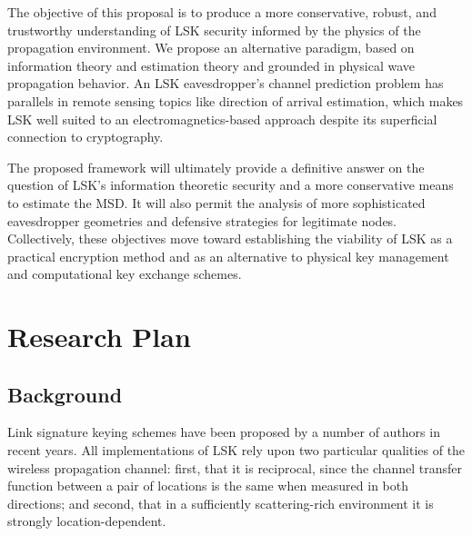 \documentclass[12pt, titlepage]{article}
\begin{document}
The objective of this proposal is to produce a more conservative, robust, and trustworthy understanding of LSK security informed by the physics of the propagation environment.  We propose an alternative paradigm, based on information theory and estimation theory and grounded in physical wave propagation behavior.  An LSK eavesdropper's channel prediction problem has parallels in remote sensing topics like direction of arrival estimation, which makes LSK well suited to an electromagnetics-based approach despite its superficial connection to cryptography.

The proposed framework will ultimately provide
%
a definitive answer on the question of LSK's information theoretic security 
%
and a more conservative means to estimate the MSD.  It will also 
%
permit the analysis of more sophisticated eavesdropper geometries and 
%
defensive strategies for legitimate nodes.  Collectively, these objectives 
%
move toward establishing the viability of LSK as a practical encryption method and as an alternative to physical key management and computational key exchange schemes.

\section*{Research Plan}
\subsection*{Background}
Link signature keying schemes have been proposed by a number of authors in recent years.  All implementations of LSK rely upon two particular qualities of the wireless propagation channel: first, that it is reciprocal, since the channel transfer function between a pair of locations is the same when measured in both directions; and second, that in a sufficiently scattering-rich environment it is strongly location-dependent. 
\end{document}

